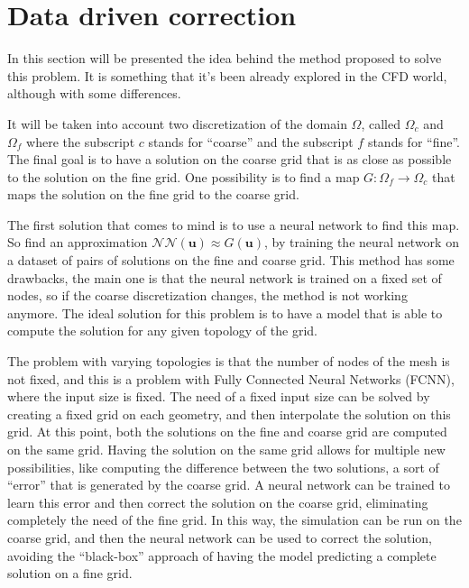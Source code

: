 \section{Data driven correction}
\label{sec:neural_network}

In this section will be presented the idea behind the method proposed to solve this problem. It is something that it's been already explored in the CFD world, although with some differences. 

It will be taken into account two discretization of the domain \(\Omega\), called \(\Omega_c\) and \(\Omega_f\) where the subscript \(c\) stands for ``coarse'' and the subscript \(f\) stands for ``fine''. The final goal is to have a solution on the coarse grid that is as close as possible to the solution on the fine grid. One possibility is to find a map \(G: \Omega_f \rightarrow \Omega_c\) that maps the solution on the fine grid to the coarse grid. 

The first solution that comes to mind is to use a neural network to find this map. So find an approximation \(\mathcal{NN}(\bm{u}) \approx G(\bm{u})\), by training the neural network on a dataset of pairs of solutions on the fine and coarse grid. This method has some drawbacks, the main one is that the neural network is trained on a fixed set of nodes, so if the coarse discretization changes, the method is not working anymore. The ideal solution for this problem is to have a model that is able to compute the solution for any given topology of the grid.

The problem with varying topologies is that the number of nodes of the mesh is not fixed, and this is a problem with Fully Connected Neural Networks (FCNN), where the input size is fixed. The need of a fixed input size can be solved by creating a fixed grid on each geometry, and then interpolate the solution on this grid. At this point, both the solutions on the fine and coarse grid are computed on the same grid. Having the solution on the same grid allows for multiple new possibilities, like computing the difference between the two solutions, a sort of ``error'' that is generated by the coarse grid. A neural network can be trained to learn this error and then correct the solution on the coarse grid, eliminating completely the need of the fine grid. In this way, the simulation can be run on the coarse grid, and then the neural network can be used to correct the solution, avoiding the ``black-box'' approach of having the model predicting a complete solution on a fine grid. 